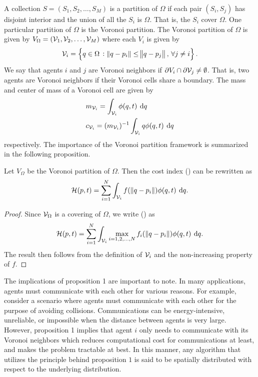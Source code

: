 \documentclass[10pt,conference]{IEEEtran}
\begin{document}
		A collection $S = (S_1, S_2, \dots, S_M)$ is a partition of $\Omega$ if each pair $(S_i, S_j)$ has disjoint interior and the union of all the $S_i$ is $\Omega$. That is, the $S_i$ cover $\Omega$. One particular partition of $\Omega$ is the Voronoi partition. The Voronoi partition of $\Omega$ is given by $V_{\Omega} = (\mathcal{V}_1, \mathcal{V}_2, \dots, \mathcal{V}_M)$ where each $V_i$ is given by 
		\begin{equation}
			\label{voronoi partitions}
			\displaystyle \V_i = \left\{ q \in \Omega \, : \, \norm{q - p_i} \leq \norm{q - p_j}, \, \forall j \neq i \right\}.
		\end{equation}
		We say that agents $i$ and $j$ are Voronoi neighbors if $\partial V_i \cap \partial \mathcal{V}_j \neq \emptyset$. That is, two agents are Voronoi neighbors if their Voronoi cells share a boundary. The mass and center of mass of a Voronoi cell are given by 
		\begin{align}
			\displaystyle &m_{\V_i} = \int_{\V_i}{\phi(q,t) \: \dif q} \\
			&c_{\V_i} = (m_{\V_i})^{-1}\int_{\V_i}{q\phi(q,t) \: \dif q}
		\end{align}
		respectively. The importance of the Voronoi partition framework is summarized in the following proposition. 
		\begin{prop}
			Let $V_\Omega$ be the Voronoi partition of $\Omega$. Then the cost index () can be rewritten as 
			\begin{equation}
				\label{cost function rewritten}
				\displaystyle \mathcal{H}(p, t) = \sum\limits_{i=1}^{N}{\int_{\V_i}{f(\, \norm{q - p_i}) \phi(q,t) \: \dif q}}.
			\end{equation}
		\end{prop}
		\begin{proof}
			Since $\mathcal{V}_\Omega$ is a covering of $\Omega$, we write () as 
			\begin{equation*}
				\displaystyle \mathcal{H}(p,t) = \sum\limits_{i=1}^{N}{\int_{\V_i}{\max\limits_{i=1,2,\dots,N}{f_i(\, \norm{q-p_i}) \phi(q,t) \: \dif q}}}.
			\end{equation*}
			The result then follows from the definition of $\mathcal{V}_i$ and the non-increasing property of $f$.
		\end{proof}
		The implications of proposition 1 are important to note. In many applications, agents must communicate with each other for various reasons. For example, consider a scenario where agents must communicate with each other for the purpose of avoiding collisions. Communications can be energy-intensive, unreliable, or impossible when the distance between agents is very large. However, proposition 1 implies that agent $i$ only needs to communicate with its Voronoi neighbors which reduces computational cost for communications at least, and makes the problem tractable at best. In this manner, any algorithm that utilizes the principle behind proposition $1$ is said to be spatially distributed with respect to the underlying distribution. 
\end{document}
